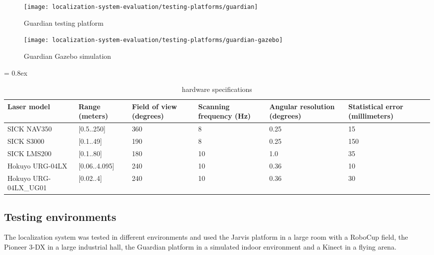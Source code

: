 \begin{figure}[H]
	\centering
	\begin{minipage}[hb]{0.24\textwidth}
		\centering
		\texttt{[image: localization-system-evaluation/testing-platforms/guardian]}
		\caption{Guardian testing platform}
		\label{fig:localization-system-evaluation_guardian}
	\end{minipage}\hfill
	\begin{minipage}[hb]{0.24\textwidth}
		\centering
		\texttt{[image: localization-system-evaluation/testing-platforms/guardian-gazebo]}
		\caption{Guardian Gazebo simulation}
		\label{fig:localization-system-evaluation_guardian_gazebo}
	\end{minipage}
\end{figure}


\begin{table*}[t]
	\caption{ hardware specifications}
	\tabulinesep = 0.8ex
	\centering
	\small
	\begin{tabu} { X[2.5,m,c] | X[m,c] X[m,c] X[m,c] X[m,c] X[m,c] }
		\rowfont{\bfseries\itshape\small} Laser model & Range (meters) & Field of view (degrees) & Scanning frequency (Hz) & Angular resolution (degrees) & Statistical error (millimeters) \\
		\hline
		{\small SICK NAV350} 			& [0.5..250] 	& 360 	& 8 	& 0.25 	& 15 	\\
		{\small SICK S3000} 			& [0.1..49] 	& 190 	& 8 	& 0.25 	& 150 	\\
		{\small SICK LMS200} 			& [0.1..80] 	& 180 	& 10 	& 1.0 	& 35 	\\
		{\small Hokuyo URG-04LX} 		& [0.06..4.095] & 240 	& 10 	& 0.36 	& 10 	\\
		{\small Hokuyo URG-04LX\_UG01} 	& [0.02..4] 	& 240 	& 10 	& 0.36 	& 30 	\\
	\end{tabu}
	\label{tab:localization-system-evaluation_laser-hardware-specifications}
\end{table*}



\subsection{Testing environments}

The localization system was tested in different environments and used the Jarvis platform in a large room with a RoboCup field, the Pioneer 3-DX in a large industrial hall, the Guardian platform in a simulated indoor environment and a Kinect in a flying arena.


